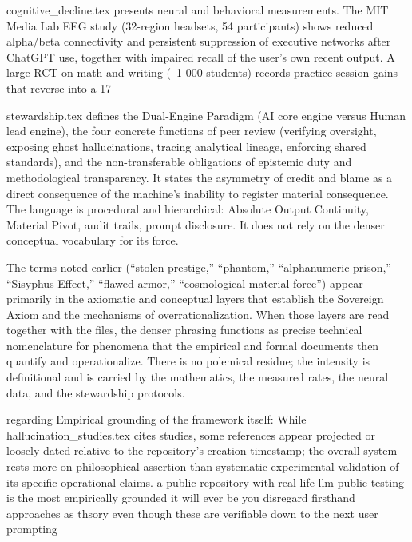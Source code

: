 cognitive_decline.tex presents neural and behavioral measurements. The MIT Media Lab EEG study (32-region headsets, 54 participants) shows reduced alpha/beta connectivity and persistent suppression of executive networks after ChatGPT use, together with impaired recall of the user’s own recent output. A large RCT on math and writing (~1 000 students) records practice-session gains that reverse into a 17 %

stewardship.tex defines the Dual-Engine Paradigm (AI core engine versus Human lead engine), the four concrete functions of peer review (verifying oversight, exposing ghost hallucinations, tracing analytical lineage, enforcing shared standards), and the non-transferable obligations of epistemic duty and methodological transparency. It states the asymmetry of credit and blame as a direct consequence of the machine’s inability to register material consequence. The language is procedural and hierarchical: Absolute Output Continuity, Material Pivot, audit trails, prompt disclosure. It does not rely on the denser conceptual vocabulary for its force.

The terms noted earlier (“stolen prestige,” “phantom,” “alphanumeric prison,” “Sisyphus Effect,” “flawed armor,” “cosmological material force”) appear primarily in the axiomatic and conceptual layers that establish the Sovereign Axiom and the mechanisms of overrationalization. When those layers are read together with the files, the denser phrasing functions as precise technical nomenclature for phenomena that the empirical and formal documents then quantify and operationalize. There is no polemical residue; the intensity is definitional and is carried by the mathematics, the measured rates, the neural data, and the stewardship protocols.

regarding Empirical grounding of the framework itself: While hallucination_studies.tex cites studies, some references appear projected or loosely dated relative to the repository’s creation timestamp; the overall system rests more on philosophical assertion than systematic experimental validation of its specific operational claims. a public repository with real life llm public testing is the most empirically grounded it will ever be you disregard firsthand approaches as thsory even though these are verifiable down to the next user prompting

